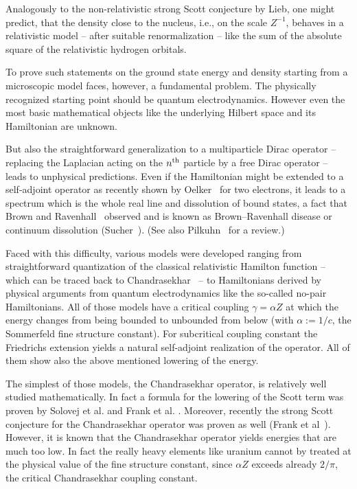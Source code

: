 \documentclass[10pt]{amsart}
\theoremstyle{definition}
\begin{document}
Analogously to the non-relativistic strong Scott conjecture by Lieb, one might predict, that the density close to the nucleus, i.e., on the scale $Z^{-1}$, behaves in a relativistic model -- after suitable renormalization -- like the sum of the absolute square of the relativistic hydrogen orbitals.

To prove such statements on the ground state energy and density starting from a microscopic model faces, however, a fundamental problem. The physically recognized starting point should be quantum electrodynamics. However even the most basic mathematical objects like the underlying Hilbert space and its Hamiltonian are unknown.

But also the straightforward generalization to a multiparticle Dirac operator -- replacing the Laplacian acting on the $n^{\rm th}$ particle by a free Dirac operator -- leads to unphysical predictions. Even if the Hamiltonian might be extended to a self-adjoint operator as recently shown by Oelker~\cite{Oelker2019} for two electrons, it leads to a spectrum which is the whole real line and dissolution of bound states, a fact that Brown and Ravenhall~\cite{BrownRavenhall1951} observed and is known as Brown--Ravenhall disease or continuum dissolution (Sucher~\cite{Sucher1980}). (See also Pilkuhn~\cite[Section~3.7]{Pilkuhn2005} for a review.)

Faced with this difficulty, various models were developed ranging from straightforward quantization of the classical relativistic Hamilton function -- which can be traced back to Chandrasekhar~\cite{Chandrasekhar1931} -- to Hamiltonians derived by physical arguments from quantum electrodynamics like the so-called no-pair Hamiltonians. All of those models have a critical coupling $\gamma=\alpha Z$ at which the energy changes from being bounded to unbounded from below (with $\alpha:=1/c$, the Sommerfeld fine structure constant). For subcritical coupling constant the Friedrichs extension yields a natural self-adjoint realization of the operator. All of them show also the above mentioned lowering of the energy.

The simplest of those models, the Chandrasekhar operator, is relatively well studied mathematically. In fact a formula for the lowering of the Scott term was proven by Solovej et al. \cite{Solovejetal2008} and Frank et al. \cite{Franketal2008}. Moreover, recently the strong Scott conjecture for the Chandrasekhar operator was proven as well (Frank et al~\cite{Franketal2020P}). However, it is known that the Chandrasekhar operator yields energies that are much too low. In fact the really heavy elements like uranium cannot by treated at the physical value of the fine structure constant, since $\alpha Z$ exceeds already $2/\pi$, the critical Chandrasekhar coupling constant.
\end{document}
